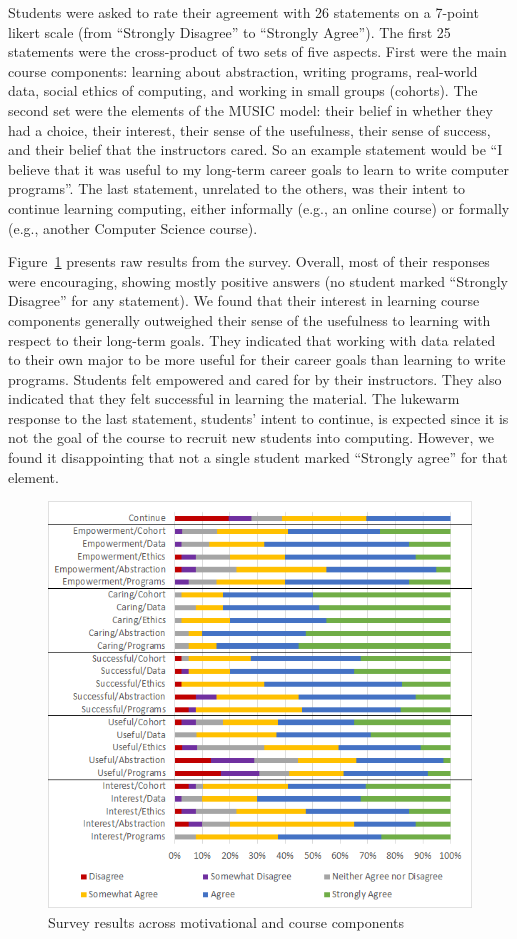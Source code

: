 \documentclass{sig-alternate}
\begin{document}
Students were asked to rate their agreement with 26 statements on a 7-point likert scale (from ``Strongly Disagree'' to ``Strongly Agree'').
The first 25 statements were the cross-product of two sets of five aspects. First were the main course components: learning about abstraction, writing programs, real-world data, social ethics of computing, and working in small groups (cohorts).
The second set were the elements of the MUSIC model: their belief in whether they had a choice, their interest, their sense of the usefulness, their sense of success, and their belief that the instructors cared.
So an example statement would be ``I believe that it was useful to my long-term career goals to learn to write computer programs''.
The last statement, unrelated to the others, was their intent to continue learning computing, either informally (e.g., an online course) or formally (e.g., another Computer Science course).

Figure~\ref{fig:survey} presents raw results from the survey.
Overall, most of their responses were encouraging, showing mostly positive answers (no student marked ``Strongly Disagree'' for any statement).
We found that their interest in learning course components generally outweighed their sense of the usefulness to learning with respect to their long-term goals.
They indicated that working with data related to their own major to be more useful for their career goals than learning to write programs.
Students felt empowered and cared for by their instructors.
They also indicated that they felt successful in learning the material.
The lukewarm response to the last statement, students' intent to continue, is expected since it is not the goal of the course to recruit new students into computing.
However, we found it disappointing that not a single student marked ``Strongly agree'' for that element.

\begin{figure}[hb!]
    \centering
    \includegraphics[width=.47\textwidth]{graphics/survey-results}
    \caption{Survey results across motivational and course components}
    \label{fig:survey}
\end{figure}
\end{document}

